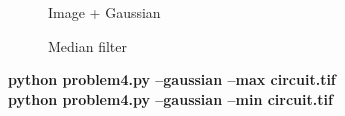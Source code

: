 \begin{figure}[!htb]
\begin{minipage}{0.45\textwidth}
        \caption{\small{Image + Gaussian}}
    \end{minipage}
\end{figure}

\begin{figure}[!htb]\centering
    \begin{minipage}{0.45\textwidth}
        \caption{\small{Median filter}}\label{diagram:gaussian_median}
    \end{minipage}
\end{figure}

\pagebreak
\begin{minipage}{\textwidth}
\textbf{python problem4.py --gaussian --max circuit.tif} \\
\textbf{python problem4.py --gaussian --min circuit.tif} \\
\end{minipage}

